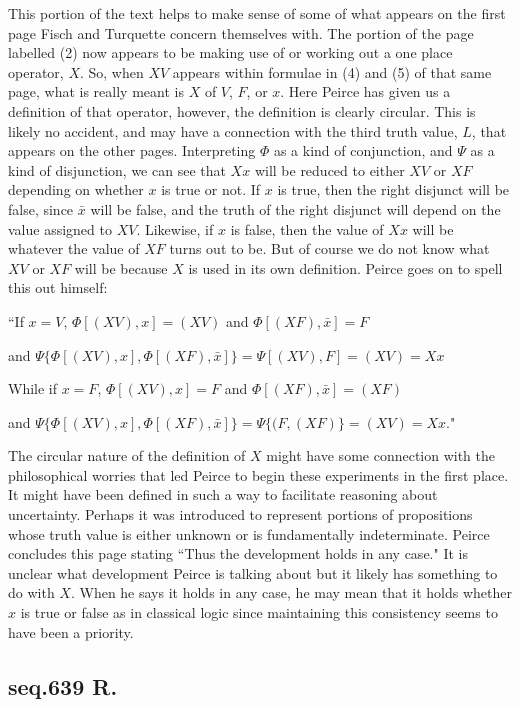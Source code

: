 \documentclass[12pt]{article}
\begin{document}
\noindent This portion of the text helps to make sense of some of what appears on the first page Fisch and Turquette concern themselves with. The portion of the page labelled (2) now appears to be making use of or working out a one place operator, $X$. So, when $XV$ appears within formulae in (4) and (5) of that same page, what is really meant is $X$ of $V$, $F$, or $x$. Here Peirce has given us a definition of that operator, however, the definition is clearly circular. This is likely no accident, and may have a connection with the third truth value, $L$, that appears on the other pages. Interpreting $\Phi$ as a kind of conjunction, and $\Psi$ as a kind of disjunction, we can see that $Xx$ will be reduced to either $XV$ or $XF$ depending on whether $x$ is true or not. If $x$ is true, then the right disjunct will be false, since $\bar{x}$ will be false, and the truth of the right disjunct will depend on the value assigned to $XV$. Likewise, if $x$ is false, then the value of $Xx$ will be whatever the value of $XF$ turns out to be. But of course we do not know what $XV$ or $XF$ will be because $X$ is used in its own definition. Peirce goes on to spell this out himself:
\begin{singlespace}
``If $x=V$, $\Phi[(XV), x]=(XV)$ and $\Phi[(XF), \bar{x}]=F$

and $\Psi\{\Phi[(XV), x],\Phi[(XF), \bar{x}]\}=\Psi[(XV), F]= (XV)=Xx$

While if $x=F$, $\Phi[(XV), x]=F$ and $\Phi[(XF), \bar{x}]=(XF)$

and $\Psi\{\Phi[(XV), x],\Phi[(XF), \bar{x}]\}=\Psi\{(F, (XF)\}= (XV)=Xx$."
\end{singlespace}
The circular nature of the definition of $X$ might have some connection with the philosophical worries that led Peirce to begin these experiments in the first place. It might have been defined in such a way to facilitate reasoning about uncertainty. Perhaps it was introduced to represent portions of propositions whose truth value is either unknown or is fundamentally indeterminate. Peirce concludes this page stating ``Thus the development holds in any case." It is unclear what development Peirce is talking about but it likely has something to do with $X$. When he says it holds in any case, he may mean that it holds whether $x$ is true or false as in classical logic since maintaining this consistency seems to have been a priority.

\subsection{seq.639 R.}
\end{document}
